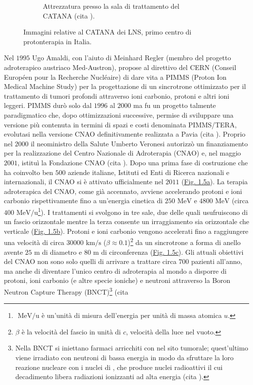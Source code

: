 \documentclass[12pt,a4paper,twoside]{report}
\begin{document}
\begin{figure}[H]
\begin{subfigure}[b]{0.49\textwidth}
			\caption{Attrezzatura presso la sala di trattamento del CATANA (cita
				).}
			\label{fig:catana2}
		\end{subfigure}
		\caption{Immagini relative al CATANA dei LNS, primo centro di protonterapia in Italia.}
		\label{fig:catana}
	\end{figure}
	Nel $1995$ Ugo Amaldi, con l'aiuto di Meinhard Regler (membro del progetto adroterapico austriaco Med-Austron), propose al direttivo del CERN (Conseil Européen pour la Recherche Nucléaire) di dare vita a PIMMS (Proton Ion Medical Machine Study) per la progettazione di un sincrotrone ottimizzato per il trattamento di tumori profondi attraverso ioni carbonio, protoni e altri ioni leggeri. PIMMS durò solo dal $1996$ al $2000$ ma fu un progetto talmente paradigmatico che, dopo ottimizzazioni successive, permise di sviluppare una versione più contenuta in termini di spazi e costi denominata PIMMS/TERA, evolutasi nella versione CNAO definitivamente realizzata a Pavia (cita
	). Proprio nel $2000$ il neoministro della Salute Umberto Veronesi autorizzò un finanziamento per la realizzazione del Centro Nazionale di Adroterapia (CNAO) e, nel maggio $2001$, istituì la Fondazione CNAO (cita
	). Dopo una prima fase di costruzione che ha coinvolto ben $500$ aziende italiane, Istituti ed Enti di Ricerca nazionali e internazionali, il CNAO si è attivato ufficialmente nel $2011$ (\hyperref[fig:edificio_cnao]{Fig. 1.5a}). La terapia adroterapica del CNAO, come già accennato, avviene accelerando protoni e ioni carbonio rispettivamente fino a un'energia cinetica di $250 \mbox{ MeV}$ e $4800\mbox{ MeV}$ (circa $400\mbox{ MeV/u}$\footnote{$\mbox{ MeV/u}$ è un'unità di misura dell'energia per unità di massa atomica $u$.}). I trattamenti si svolgono in tre sale, due delle quali usufruiscono di un fascio orizzontale mentre la terza consente un irraggiamento sia orizzontale che verticale (\hyperref[fig:sala_cnao]{Fig. 1.5b}). Protoni e ioni carbonio vengono accelerati fino a raggiungere una velocità di circa \num{30000}$\mbox{ km/s}$ ($\beta\approx0.1$)\footnote{$\beta$ è la velocità del fascio in unità di $c$, velocità della luce nel vuoto.} da un sincrotrone a forma di anello avente $25\mbox{ m}$ di diametro e $80\mbox{ m}$ di circonferenza (\hyperref[fig:sincrotrone_cnao]{Fig. 1.5c}). Gli attuali obiettivi del CNAO non sono solo quelli di arrivare a trattare circa $700$ pazienti all’anno, ma anche di diventare l’unico centro di adroterapia al mondo a disporre di protoni, ioni carbonio (e altre specie ioniche) e neutroni attraverso la Boron Neutron Capture Therapy (BNCT)\footnote{Nella BNCT si iniettano farmaci arricchiti con  nel sito tumorale; quest'ultimo viene irradiato con neutroni di bassa energia in modo da sfruttare la loro reazione nucleare con i nuclei di , che produce nuclei radioattivi il cui decadimento libera radiazioni ionizzanti ad alta energia (cita
		).} (cita
\end{document}
